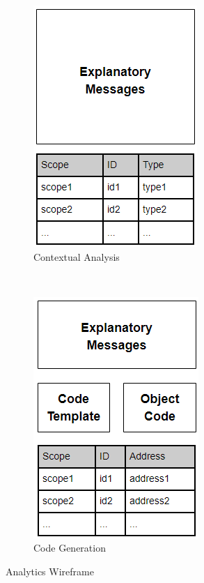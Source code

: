 \documentclass{l4proj}
\begin{document}
\begin{figure}
	\centering
	\begin{subfigure}[b]{0.45\textwidth}
		\includegraphics[]{images/analytics-ca-wireframe.png}
		\caption{Contextual Analysis}
		\label{fig:analytics-ca-wireframe}
	\end{subfigure}
	~
	\begin{subfigure}[b]{0.45\textwidth}
		\includegraphics[]{images/analytics-cg-wireframe.png}
		\caption{Code Generation}
		\label{fig:analytics-cg-wireframe}
	\end{subfigure}
	\caption{Analytics Wireframe}\label{fig:analytics-wireframe}	
\end{figure}



\begin{appendices}

\end{appendices}




\end{document}
